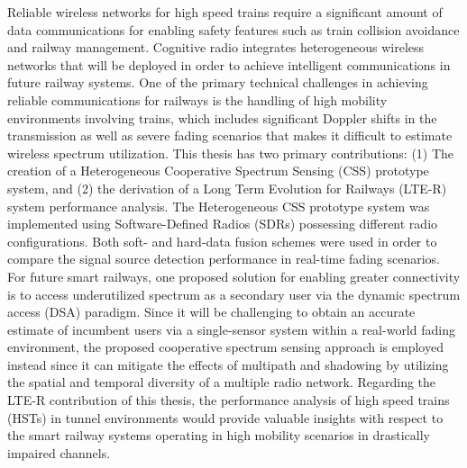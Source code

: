 Reliable wireless networks for high speed trains require a significant amount of data communications for enabling safety features such as train collision avoidance and railway management. Cognitive radio integrates heterogeneous wireless networks that will be deployed in order to achieve intelligent communications in future railway systems. One of the primary technical challenges in achieving reliable communications for railways is the handling of high mobility environments involving trains, which includes significant Doppler shifts in the transmission as well as severe fading scenarios that makes it difficult to estimate wireless spectrum utilization. This thesis has two primary contributions: (1) The creation of a Heterogeneous Cooperative Spectrum Sensing (CSS) prototype system, and (2) the derivation of a Long Term Evolution for Railways (LTE-R) system performance analysis. The Heterogeneous CSS prototype system was implemented using Software-Defined Radios (SDRs) possessing different radio configurations. Both soft- and hard-data fusion schemes were used in order to compare the signal source detection performance in real-time fading scenarios. For future smart railways, one proposed solution for enabling greater connectivity is to access underutilized spectrum as a secondary user via the dynamic spectrum access (DSA) paradigm. Since it will be challenging to obtain an accurate estimate of incumbent users via a single-sensor system within a real-world fading environment, the proposed cooperative spectrum sensing approach is employed instead since it can mitigate the effects of multipath and shadowing by utilizing the spatial and temporal diversity of a multiple radio network. Regarding the LTE-R contribution of this thesis, the performance analysis of high speed trains (HSTs) in tunnel environments would provide valuable insights with respect to the smart railway systems operating in high mobility scenarios in drastically impaired channels.
